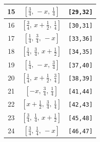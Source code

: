 \documentclass[fleqn,8pt]{jsarticle}
\begin{document}
\begin{longtable}{ccc}
15 & $\left[ \frac{3}{4},\, - x,\, \frac{1}{4} \right]$ & {\tt [29,32]} \\ \hline
16 & $\left[ \frac{3}{4},\, x + \frac{1}{2},\, \frac{1}{4} \right]$ & {\tt [30,31]} \\ \hline
17 & $\left[ \frac{1}{4},\, \frac{3}{4},\, - x \right]$ & {\tt [33,36]} \\ \hline
18 & $\left[ \frac{1}{4},\, \frac{3}{4},\, x + \frac{1}{2} \right]$ & {\tt [34,35]} \\ \hline
19 & $\left[ \frac{1}{4},\, - x,\, \frac{3}{4} \right]$ & {\tt [37,40]} \\ \hline
20 & $\left[ \frac{1}{4},\, x + \frac{1}{2},\, \frac{3}{4} \right]$ & {\tt [38,39]} \\ \hline
21 & $\left[ - x,\, \frac{3}{4},\, \frac{1}{4} \right]$ & {\tt [41,44]} \\ \hline
22 & $\left[ x + \frac{1}{2},\, \frac{3}{4},\, \frac{1}{4} \right]$ & {\tt [42,43]} \\ \hline
23 & $\left[ \frac{3}{4},\, \frac{1}{4},\, x + \frac{1}{2} \right]$ & {\tt [45,48]} \\ \hline
24 & $\left[ \frac{3}{4},\, \frac{1}{4},\, - x \right]$ & {\tt [46,47]} \\
\end{longtable}
\renewcommand{\arraystretch}{1.2}
\end{document}
